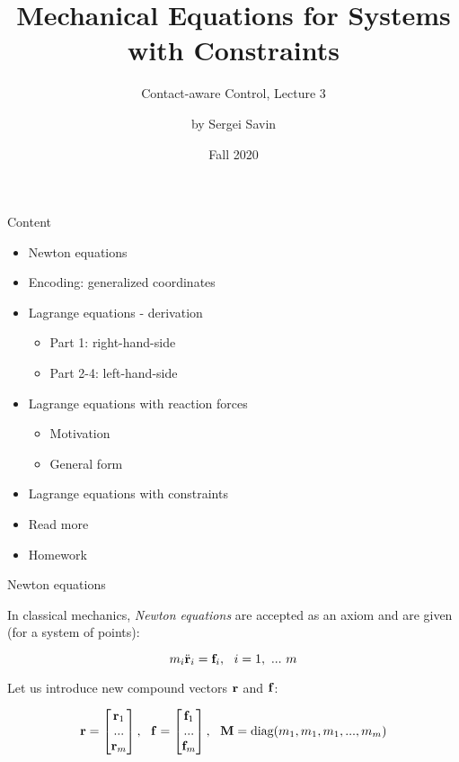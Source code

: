 \documentclass{beamer}
\title{Mechanical Equations for Systems with Constraints}
\subtitle{Contact-aware Control, Lecture 3}
\author{by Sergei Savin}
\date{Fall 2020}
\begin{document}
\maketitle


\begin{frame}{Content}

\begin{itemize}
\item Newton equations
\item Encoding: generalized coordinates
\item Lagrange equations - derivation
\begin{itemize}
\item Part 1: right-hand-side
\item Part 2-4: left-hand-side
\end{itemize}
\item Lagrange equations with reaction forces
\begin{itemize}
\item Motivation
\item General form
\end{itemize}
\item Lagrange equations with constraints
\item Read more
\item Homework
\end{itemize}

\end{frame}



\begin{frame}{Newton equations}
\begin{flushleft}

In classical mechanics, \emph{Newton equations} are accepted as an axiom and are given (for a system of points):

\begin{equation}
\label{eq:Newton}
    m_i\ddot{\mathbf{r}}_i = \mathbf{f}_i, \ \ i = 1, \ ... \ m  
\end{equation}

Let us introduce new compound vectors $\mathbf{r}$ and $\mathbf{f}$:

\begin{equation}
    \bo{r} = \begin{bmatrix} \bo{r}_1 \\ ... \\ \bo{r}_m \end{bmatrix}, \ \ 
    \bo{f} = \begin{bmatrix} \bo{f}_1 \\ ... \\ \bo{f}_m \end{bmatrix}, \ \
    \bo{M} = \text{diag}(m_1, m_1, m_1, ..., m_m)
\end{equation}

\end{flushleft}
\end{frame}
\end{document}
